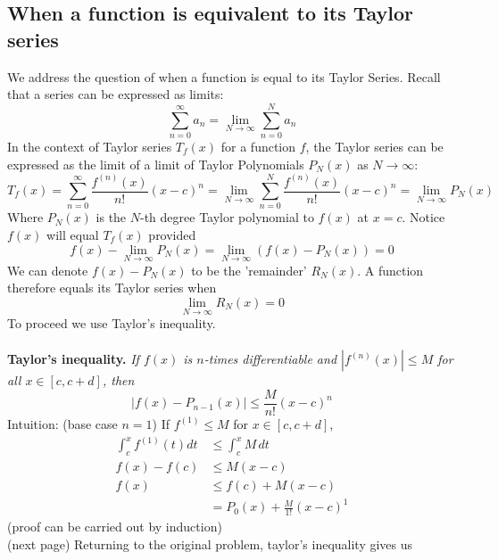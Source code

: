 \documentclass{report}
\begin{document}
\subsection{When a function is equivalent to its Taylor series} %
We address the question of when a function is equal to its Taylor Series. Recall that
a series can be expressed as limits:
\begin{equation*}
\sum_{n=0}^\infty a_n=\lim_{N\to\infty}\sum^N_{n=0}a_n
\end{equation*}
In the context of Taylor series $T_f(x)$ for a function $f$, the Taylor series can be expressed as the limit of 
a limit of Taylor Polynomials $P_N(x)$ as $N\to\infty$:
\begin{equation*}
T_f(x)=\sum_{n=0}^\infty\frac{f^{(n)}(x)}{n!}(x-c)^n
=\lim_{N\to\infty}\sum^N_{n=0}\frac{f^{(n)}(x)}{n!}(x-c)^n=\lim_{N\to\infty}P_N(x)
\end{equation*}
Where $P_N(x)$ is the $N$-th degree Taylor polynomial to $f(x)$ at $x=c$.
Notice $f(x)$ will equal $T_f(x)$ provided
\begin{equation*}
f(x)-\lim_{N\to\infty}P_N(x)=\lim_{N\to\infty}(f(x)-P_N(x))=0
\end{equation*}
We can denote $f(x)-P_N(x)$ to be the 'remainder' $R_N(x)$. A function therefore equals its Taylor series when 
\begin{equation*}
\lim_{N\to\infty}R_N(x)=0
\end{equation*}
To proceed we use Taylor's inequality.\\
\vspace{1mm}\\
\textbf{Taylor's inequality.} \textit{If $f(x)$ is $n$-times differentiable and $|f^{(n)}(x)|\leq M$ for all $x\in[c,c+d]$, then}
\begin{equation*}
|f(x)-P_{n-1}(x)|\leq\frac{M}{n!}(x-c)^n
\end{equation*}
Intuition: (base case $n=1$) If $f^{(1)}\leq M$ for $x\in[c,c+d]$,
\begin{align*}
\int_c^xf^{(1)}(t)dt&\leq\int_c^xM\,dt\\
f(x)-f(c)&\leq M(x-c)\\
f(x)&\leq f(c)+M(x-c)\\
&=P_0(x)+\frac{M}{1!}(x-c)^1
\end{align*}
(proof can be carried out by induction)\\
(next page)
\newpage
\noindent Returning to the original problem, taylor's inequality gives us\\
\vspace{1mm}\\
\end{document}
